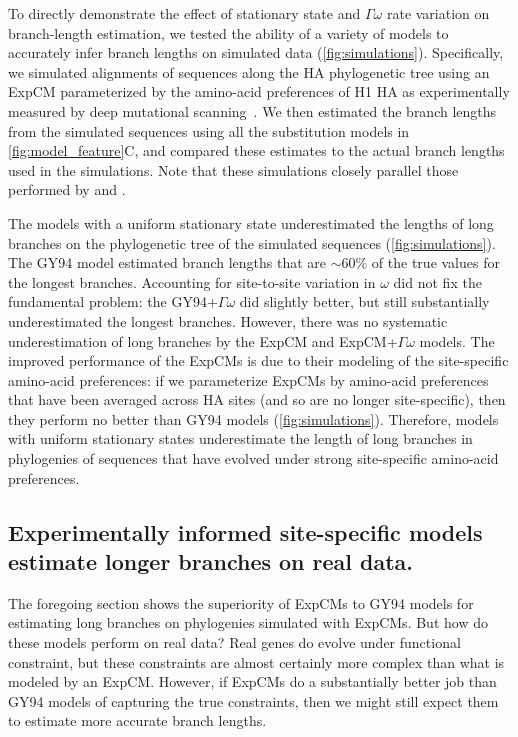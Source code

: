 \documentclass[11pt]{article}
\begin{document}
To directly demonstrate the effect of stationary state and $\Gamma\omega$ rate variation on branch-length estimation, we tested the ability of a variety of models to accurately infer branch lengths on simulated data (\ref{fig:simulations}).
Specifically, we simulated alignments of sequences along the HA phylogenetic tree using an ExpCM parameterized by the amino-acid preferences of H1 HA as experimentally measured by deep mutational scanning~\citep{doud2016accurate}. We then estimated the branch lengths from the simulated sequences using all the substitution models in \ref{fig:model_feature}C, and compared these estimates to the actual branch lengths used in the simulations.
Note that these simulations closely parallel those performed by \citet{halpern1998evolutionary} and \citet{wertheim2011purifying}.

The models with a uniform stationary state underestimated the lengths of long branches on the phylogenetic tree of the simulated sequences (\ref{fig:simulations}). 
The GY94 model estimated branch lengths that are $\sim$60\% of the true values for the longest branches. 
Accounting for site-to-site variation in $\omega$ did not fix the fundamental problem: the GY94+$\Gamma\omega$ did slightly better, but still substantially underestimated the longest branches.
However, there was no systematic underestimation of long branches by the ExpCM and ExpCM+$\Gamma\omega$ models.
The improved performance of the ExpCMs is due to their modeling of the site-specific amino-acid preferences: if we parameterize ExpCMs by amino-acid preferences that have been averaged across HA sites (and so are no longer site-specific), then they perform no better than GY94 models (\ref{fig:simulations}).
Therefore, models with uniform stationary states underestimate the length of long branches in phylogenies of sequences that have evolved under strong site-specific amino-acid preferences.


\subsection*{Experimentally informed site-specific models estimate longer branches on real data.}

The foregoing section shows the superiority of ExpCMs to GY94 models for estimating long branches on phylogenies simulated with ExpCMs.
But how do these models perform on real data?
Real genes do evolve under functional constraint, but these constraints are almost certainly more complex than what is modeled by an ExpCM.
However, if ExpCMs do a substantially better job than GY94 models of capturing the true constraints, then we might still expect them to estimate more accurate branch lengths.
\end{document}
